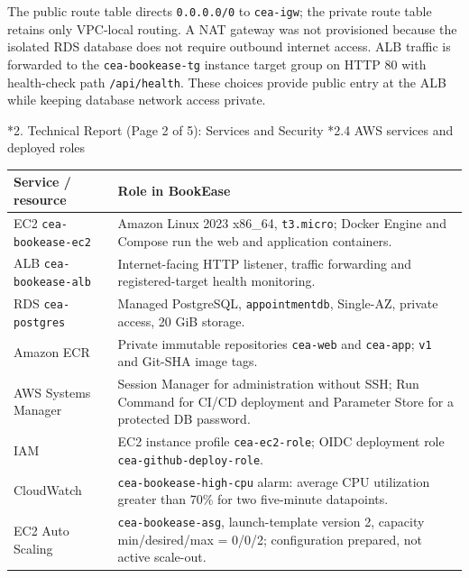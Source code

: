 \documentclass[10pt,a4paper]{article}
\makeatletter
\renewcommand{\section}{\@startsection{section}{1}{0pt}{11pt}{5pt}{\normalfont\large\bfseries\color{navy}}}
\renewcommand{\subsection}{\@startsection{subsection}{2}{0pt}{7pt}{3pt}{\normalfont\normalsize\bfseries\color{navy}}}
\makeatother
\begin{document}
The public route table directs \texttt{0.0.0.0/0} to \texttt{cea-igw}; the private route table retains only VPC-local routing. A NAT gateway was not provisioned because the isolated RDS database does not require outbound internet access. ALB traffic is forwarded to the \texttt{cea-bookease-tg} instance target group on HTTP 80 with health-check path \texttt{/api/health}. These choices provide public entry at the ALB while keeping database network access private.
\clearpage

\section*{2. Technical Report (Page 2 of 5): Services and Security}
\subsection*{2.4 AWS services and deployed roles}
\begin{tabularx}{\linewidth}{@{}p{35mm}X@{}}
\toprule
\textbf{Service / resource} & \textbf{Role in BookEase}\\
\midrule
EC2 \texttt{cea-bookease-ec2} & Amazon Linux 2023 x86\_64, \texttt{t3.micro}; Docker Engine and Compose run the web and application containers.\\
ALB \texttt{cea-bookease-alb} & Internet-facing HTTP listener, traffic forwarding and registered-target health monitoring.\\
RDS \texttt{cea-postgres} & Managed PostgreSQL, \texttt{appointmentdb}, Single-AZ, private access, 20 GiB storage.\\
Amazon ECR & Private immutable repositories \texttt{cea-web} and \texttt{cea-app}; \texttt{v1} and Git-SHA image tags.\\
AWS Systems Manager & Session Manager for administration without SSH; Run Command for CI/CD deployment and Parameter Store for a protected DB password.\\
IAM & EC2 instance profile \texttt{cea-ec2-role}; OIDC deployment role \texttt{cea-github-deploy-role}.\\
CloudWatch & \texttt{cea-bookease-high-cpu} alarm: average CPU utilization greater than 70\% for two five-minute datapoints.\\
EC2 Auto Scaling & \texttt{cea-bookease-asg}, launch-template version 2, capacity min/desired/max = 0/0/2; configuration prepared, not active scale-out.\\
\bottomrule
\end{tabularx}
\end{document}
